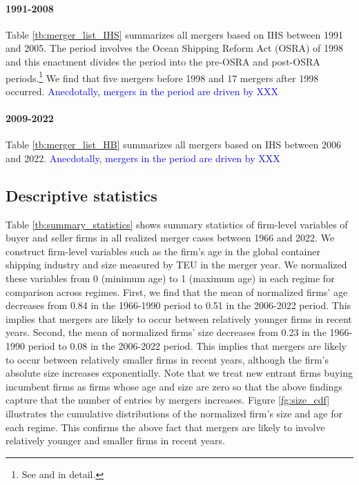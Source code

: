 \documentclass[10pt]{article}
\begin{document}
\paragraph{1991-2008}

Table \ref{tb:merger_list_IHS} summarizes all mergers based on IHS between 1991 and 2005.
The period involves the Ocean Shipping Reform Act (OSRA) of 1998 and this enactment divides the period into the pre-OSRA and post-OSRA periods.\footnote{See \cite{fusillo2006some,fusillo2013stability} and \cite{reitzes2002rolling} in detail. }
We find that five mergers before 1998 and 17 mergers after 1998 occurred.
\textcolor{blue}{Anecdotally, mergers in the period are driven by XXX}




\paragraph{2009-2022}

Table \ref{tb:merger_list_HB} summarizes all mergers based on IHS between 2006 and 2022.
\textcolor{blue}{Anecdotally, mergers in the period are driven by XXX}





\subsection{Descriptive statistics}

Table \ref{tb:summary_statistics} shows summary statistics of firm-level variables of buyer and seller firms in all realized merger cases between 1966 and 2022. 
We construct firm-level variables such as the firm's age in the global container shipping industry and size measured by TEU in the merger year. 
We normalized these variables from 0 (minimum age) to 1 (maximum age) in each regime for comparison across regimes.
First, we find that the mean of normalized firms' age decreases from 0.84 in the 1966-1990 period to 0.51 in the 2006-2022 period. This implies that mergers are likely to occur between relatively younger firms in recent years.
Second, the mean of normalized firms' size decreases from 0.23 in the 1966-1990 period to 0.08 in the 2006-2022 period. 
This implies that mergers are likely to occur between relatively smaller firms in recent years, although the firm's absolute size increases exponentially. 
Note that we treat new entrant firms buying incumbent firms as firms whose age and size are zero so that the above findings capture that the number of entries by mergers increases.
Figure \ref{fg:size_cdf} illustrates the cumulative distributions of the normalized firm's size and age for each regime. 
This confirms the above fact that mergers are likely to involve relatively younger and smaller firms in recent years.
\end{document}
